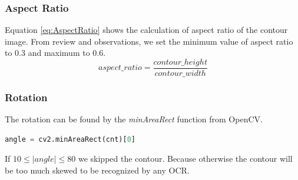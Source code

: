\documentclass{standalone}
\begin{document}
\subsubsection{Aspect Ratio}
Equation \ref{eq:AspectRatio} shows the calculation of aspect ratio of the contour image. From review and observations, we set the minimum value of aspect ratio to $0.3$ and maximum to $0.6$.
\begin{equation} \label{eq:AspectRatio}
aspect\_ratio = \dfrac{contour\_height}{contour\_width}
\end{equation}

\subsubsection{Rotation}
The rotation can be found by the {\it minAreaRect} function from OpenCV. 
\begin{lstlisting}[language=Python]
angle = cv2.minAreaRect(cnt)[0]
\end{lstlisting}
If $10 \leq |angle| \leq 80$ we skipped the contour. Because otherwise the contour will be too much skewed to be recognized by any OCR.
\end{document}
